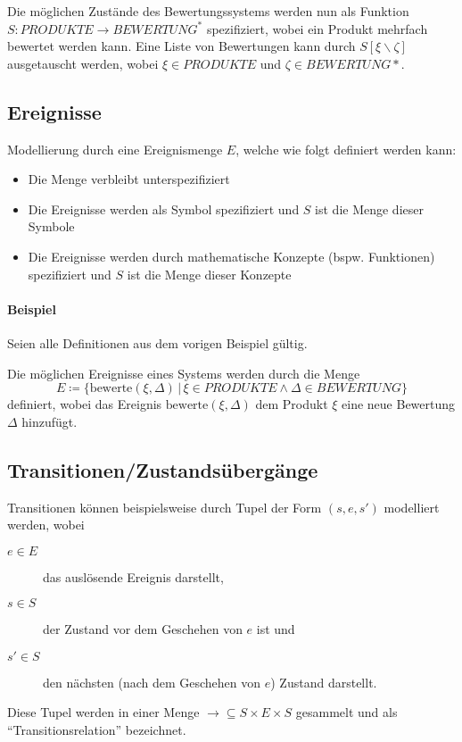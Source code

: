 \documentclass[a4paper, 11pt, accentcolor = tud3b]{tudreport}
\newcommand{\forwhich}{\ensuremath{{\,\vert\,}}}
\begin{document}
					Die möglichen Zustände des Bewertungssystems werden nun als Funktion $ S : \textit{PRODUKTE} \rightarrow \textit{BEWERTUNG} ^ * $ spezifiziert, wobei ein Produkt mehrfach bewertet werden kann. Eine Liste von Bewertungen kann durch $ S[\xi \backslash \zeta] $ ausgetauscht werden, wobei $ \xi \in \textit{PRODUKTE} $ und $ \zeta \in \textit{BEWERTUNG}* $.
		    
		    \subsection{Ereignisse}
			    Modellierung durch eine Ereignismenge $ E $, welche wie folgt definiert werden kann:
			    \begin{itemize}
			    	\item Die Menge verbleibt unterspezifiziert
			    	\item Die Ereignisse werden als Symbol spezifiziert und $ S $ ist die Menge dieser Symbole
			    	\item Die Ereignisse werden durch mathematische Konzepte (bspw. Funktionen) spezifiziert und $ S $ ist die Menge dieser Konzepte
			    \end{itemize}
			    
			    \paragraph{Beispiel}
				    Seien alle Definitionen aus dem vorigen Beispiel gültig.
				    
				    Die möglichen Ereignisse eines Systems werden durch die Menge \[ E \coloneqq \{ \text{bewerte}(\xi, \Delta) \forwhich \xi \in \textit{PRODUKTE} \land \Delta \in \textit{BEWERTUNG} \} \] definiert, wobei das Ereignis $ \text{bewerte}(\xi, \Delta) $ dem Produkt $ \xi $ eine neue Bewertung $ \Delta $ hinzufügt.
		    
		    \subsection{Transitionen/Zustandsübergänge}
			    Transitionen können beispielsweise durch Tupel der Form $ (s, e, s') $ modelliert werden, wobei
			    \begin{description}
			    	\item[$ e \in E $] das auslösende Ereignis darstellt,
			    	\item[$ s \in S $] der Zustand vor dem Geschehen von $ e $ ist und
			    	\item[$ s' \in S $] den nächsten (nach dem Geschehen von $ e $) Zustand darstellt.
			    \end{description}
			    Diese Tupel werden in einer Menge $ \rightarrow \subseteq S \times E \times S $ gesammelt und als \enquote{Transitionsrelation} bezeichnet.
			    
\end{document}
